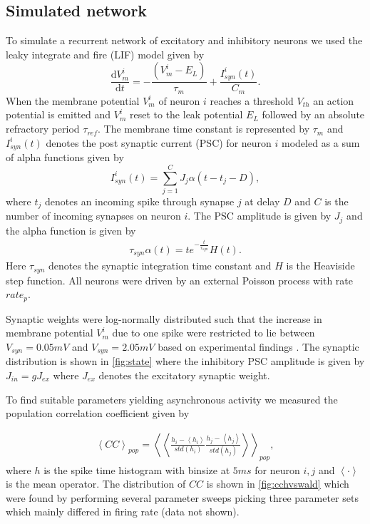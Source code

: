 \documentclass[11pt]{article}
\newcommand{\de}[2]{\frac{\mathrm{d} #1}{\mathrm{d} #2}}
\newcommand{\mean}[1]{\left<{#1}\right>}
\begin{document}
\subsection{Simulated network}
To simulate a recurrent network of excitatory and inhibitory neurons we used the leaky integrate and fire (LIF) model given by
\begin{equation}
	\de{V_m^i}{t} = - \frac{(V_m^i - E_L)}{\tau_m} + \frac{I_{syn}^i(t)}{C_m}.
    \label{eq:LIF}
\end{equation}
When the membrane potential $ V_m^{i} $ of neuron $ i $ reaches a threshold $ V_{th} $ an action potential is emitted and $ V_m^{i} $ reset to the leak potential $ E_{L} $ followed by an absolute refractory period $ \tau_{ref} $. The membrane time constant is represented by $ \tau_{m} $ and $ I_{syn}^{i}(t) $ denotes the post synaptic current (PSC) for neuron $ i $ modeled as a sum of alpha functions given by
\begin{equation}
	\label{eq:syn}
	I_{syn}^i(t) = \sum_{j=1}^C J_j \alpha(t - t_j - D),
\end{equation}
where $ t_j $ denotes an incoming spike through synapse $ j $ at delay $ D $ and $ C $ is the number of incoming synapses on neuron $ i $. The PSC amplitude is given by $ J_{j} $ and the alpha function is given by
\begin{align}
\tau_{syn}\alpha(t) = te^{-\frac{t}{\tau_{syn}}} H(t).
\end{align}
Here $ \tau_{syn} $ denotes the synaptic integration time constant and $ H $ is the Heaviside step function. All neurons were driven by an external Poisson process with rate $ rate_{p} $.

Synaptic weights were log-normally distributed such that the increase in membrane potential $ V_m^i $ due to one spike were restricted to lie between $ V_{syn} = 0.05 mV $ and $ V_{syn} = 2.05 mV $ based on experimental findings \citep{Sayer1990,Mason1991}. The synaptic distribution is shown in \cref{fig:state} where the inhibitory PSC amplitude is given by $ J_{in} = g J_{ex} $ where $ J_{ex} $ denotes the excitatory synaptic weight.

To find suitable parameters yielding asynchronous activity we measured the population correlation coefficient given by

\begin{align}
\mean{CC}_{pop} = \mean{\mean{\frac{h_{i} - \mean{h_{i}}}{std(h_{i})}\frac{h_{j} - \mean{h_{j}}}{std(h_{j})}}}_{pop},
\end{align}
where $ h $ is the spike time histogram with binsize at $ 5ms $ for neuron $ i,j $ and $ \mean{\cdot} $ is the mean operator. The distribution of $ CC $ is shown in \cref{fig:cchvswald} which were found by performing several parameter sweeps picking three parameter sets which mainly differed in firing rate (data not shown). 
\end{document}
